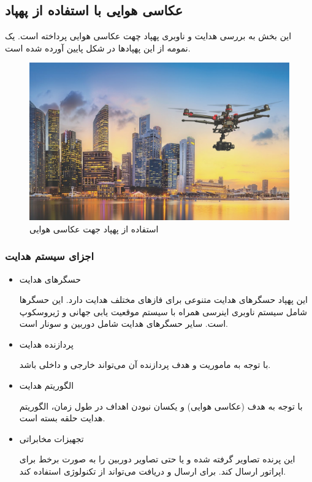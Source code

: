 \subsection{عکاسی هوایی با استفاده از پهپاد}
این بخش به بررسی هدایت و ناوبری پهپاد چهت عکاسی هوایی پرداخته است. یک نمومه از این پهپادها در شکل پایین آورده شده است.
 \begin{figure}[H]
	\centering
	\includegraphics[width=\linewidth]{../Figure/Q1/UAV-on-City.jpg}
	\caption{استفاده از پهپاد جهت عکاسی هوایی
	}
\end{figure}
\subsubsection{اجزای سیستم هدایت}
\begin{itemize}
	\item حسگرهای هدایت
	
	این پهپاد حسگرهای هدایت متنوعی برای فازهای مختلف هدایت دارد. این حسگرها شامل سیستم ناوبری اینرسی
	همراه با سیستم موقعیت یابی جهانی
	و ژیروسکوپ
	است. سایر حسگرهای هدایت شامل دوربین و سونار
	است.
	\item پردازنده هدایت
	
	با توجه به ماموریت و هدف پردازنده آن می‌تواند خارجی و داخلی باشد.
	\item الگوریتم هدایت
	
	با توجه به هدف (عکاسی هوایی) و یکسان نبودن اهداف در طول زمان، الگوریتم هدایت حلقه بسته است.
	\item تجهیزات مخابراتی
	
	این پرنده تصاویر گرفته شده و یا حتی تصاویر دوربین را به صورت برخط 
	برای اپراتور ارسال کند. برای ارسال و دریافت می‌تواند از تکنولوژی 
	استفاده کند.
\end{itemize}


